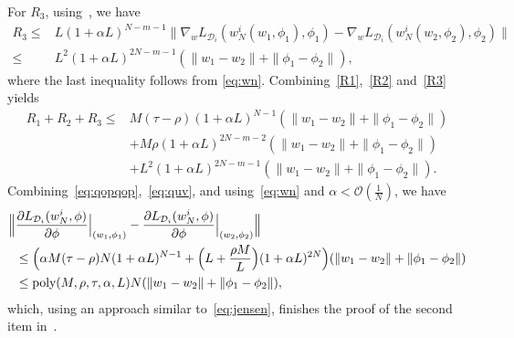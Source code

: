 \documentclass{osudissert96}
\begin{document}
For  $R_3$, using~, we have 
\begin{align}\label{R3}
R_3\leq& L (1+\alpha L)^{N-m-1} \| \nabla_w L_{\mathcal{D}_i}(w_N^i(w_1,\phi_1),\phi_1)- \nabla_w L_{\mathcal{D}_i}(w_N^i(w_2,\phi_2),\phi_2)\| \nonumber
\\\leq & L^2 (1+\alpha L)^{2N-m-1} (\|w_1-w_2\|+\|\phi_1-\phi_2\|),  
\end{align}
where the last inequality follows from \cref{eq:wn}. Combining~\cref{R1},~\cref{R2} and~\cref{R3} yields
\begin{align}\label{eq:quv}
 R_1+R_2+R_3\leq & M(\tau-\rho) (1+\alpha L)^{N-1} (\|w_1-w_2\| + \|\phi_1-\phi_2\|)  \nonumber
 \\&+M\rho(1+\alpha L)^{2N-m-2}(\|w_1-w_2\|+\|\phi_1-\phi_2\|)\nonumber
 \\&+L^2 (1+\alpha L)^{2N-m-1} (\|w_1-w_2\|+\|\phi_1-\phi_2\|).  
\end{align}
 Combining~\cref{eq:qopqop},~\cref{eq:quv}, and using~\cref{eq:wn} and $\alpha <\mathcal{O}(\frac{1}{N})$, we have 
 \begin{align}\label{eq:winnsa}
 \Big\|&\frac{\partial L_{\mathcal{D}_i}( w^i_N, \phi)}{\partial \phi}\Big |_{(w_1,\phi_1)}  - \frac{\partial L_{\mathcal{D}_i}( w^i_N, \phi)}{\partial \phi} \Big |_{(w_2,\phi_2)}\Big\| \nonumber
 \\&\leq \Big(\alpha M(\tau-\rho)  N(1+\alpha L)^{N-1} + \Big(L+\frac{\rho M}{L}\Big)(1+\alpha L)^{2N}\Big)(\|w_1-w_2\|+\|\phi_1-\phi_2\|)\nonumber
\\&\leq\text{\normalfont poly}(M,\rho,\tau,\alpha,L) N(\|w_1-w_2\| + \|\phi_1-\phi_2\|),
 \end{align}
 which, using an approach similar to~\cref{eq:jensen}, finishes the proof of the second item in~.
\end{document}
